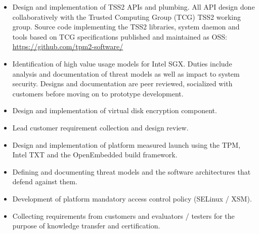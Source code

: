 \documentclass[letterpaper,11pt]{article}
\begin{document}
    \begin {itemize}
      \setlength {\itemsep}{1pt}
      \setlength {\parskip}{0pt}
      \setlength {\parsep}{0pt}
      \item Design and implementation of TSS2 APIs and plumbing. All API
        design done collaboratively with the Trusted Computing Group (TCG)
        TSS2 working group. Source code implementing the TSS2 libraries,
        system daemon and tools based on TCG specifications published and
        maintained as OSS: \url{https://github.com/tpm2-software/}
      \item Identification of high value usage models for
        Intel\textsuperscript{\textregistered} SGX. Duties include analysis
        and documentation of threat models as well as impact to system
        security. Designs and documentation are peer reviewed, socialized
        with customers before moving on to prototype development.
    \end {itemize}
    \begin {itemize}
        \setlength {\itemsep}{1pt}
        \setlength {\parskip}{0pt}
        \setlength {\parsep}{0pt}
      \item Design and implementation of virtual disk encryption component.
      \item Lead customer requirement collection and design review.
    \end {itemize}
    \begin {itemize}
        \setlength {\itemsep}{1pt}
        \setlength {\parskip}{0pt}
        \setlength {\parsep}{0pt}
      \item Design and implementation of platform measured launch using the
        TPM, Intel\textsuperscript{\textregistered} TXT and the OpenEmbedded
        build framework.
      \item Defining and documenting threat models and the software
        architectures that defend against them.
      \item Development of platform mandatory access control policy (SELinux /
        XSM).
      \item Collecting requirements from customers and evaluators / testers
        for the purpose of knowledge transfer and certification.
    \end {itemize}
\end{document}
